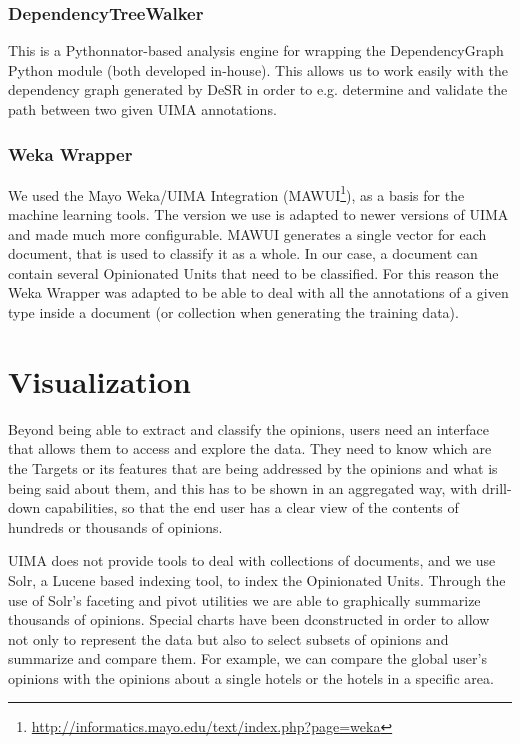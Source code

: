 \documentclass{llncs}
\begin{document}
\subsubsection{DependencyTreeWalker}

This is a Pythonnator-based analysis engine for wrapping the DependencyGraph Python module (both developed in-house). This allows us to work easily with the dependency graph generated by DeSR in order to e.g. determine and validate the path between two given UIMA annotations.

\subsubsection{Weka Wrapper}

We used the Mayo Weka/UIMA Integration (MAWUI\footnote{\url{http://informatics.mayo.edu/text/index.php?page=weka}}), as a basis for the machine learning tools. The version we use is adapted to newer versions of UIMA and made much more configurable. MAWUI generates a single vector for each document, that is used to classify it as a whole. In our case, a document can contain several Opinionated Units that need to be classified. For this reason the Weka Wrapper was adapted to be able to deal with all the annotations of a given type inside a document (or collection when generating the training data).

\section{Visualization}

Beyond being able to extract and classify the opinions, users need an interface that allows them to access and explore the data. They need to know which are the Targets or its features that are being addressed by the opinions and what is being said about them, and this has to be shown in an aggregated way, with drill-down capabilities, so that the end user has a clear view of the contents of hundreds or thousands of opinions.

UIMA does not provide tools to deal with collections of documents, and we use Solr, a Lucene based indexing tool, to index the Opinionated Units. Through the use of Solr's faceting and pivot utilities we are able to graphically summarize thousands of opinions. Special charts have been dconstructed in order to allow not only to represent the data but also to select subsets of opinions and summarize and compare them. For example, we can compare the global user's opinions with the opinions about a single hotels or the hotels in a specific area. 
\end{document}
